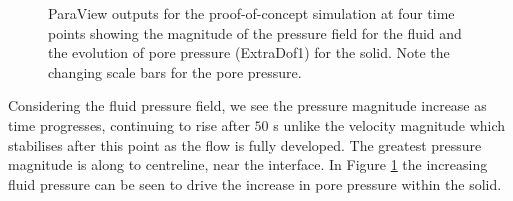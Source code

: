 \documentclass[oneside,11pt,times]{book}
\begin{document}
\begin{figure}[htbp]
\centering
{}
\caption{ParaView outputs for the proof-of-concept simulation at four time points showing the magnitude of the pressure field for the fluid and the evolution of pore pressure (ExtraDof1) for the solid. Note the changing scale bars for the pore pressure. }
\label{fig:FSI_full_p}
\end{figure}
Considering the fluid pressure field, we see the pressure magnitude increase as time progresses, continuing to rise after $50 $ s unlike the velocity magnitude which stabilises after this point as the flow is fully developed. The greatest pressure magnitude is along to centreline, near the interface. In Figure \ref{fig:FSI_full_p} the increasing fluid pressure can be seen to drive the increase in pore pressure within the solid. 
\end{document}
